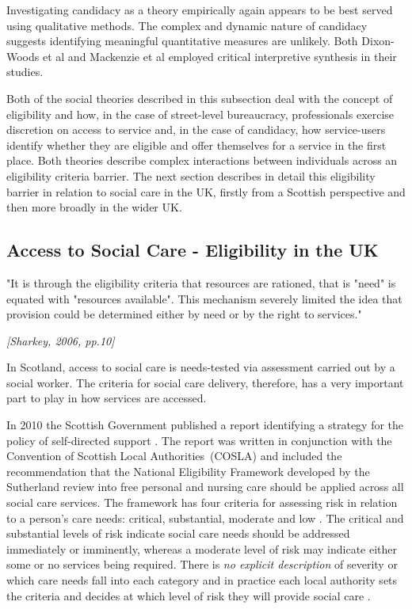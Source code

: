 \documentclass[12pt,]{report}
\begin{document}
Investigating candidacy as a theory empirically again appears to be best
served using qualitative methods. The complex and dynamic nature of
candidacy suggests identifying meaningful quantitative measures are
unlikely. Both Dixon-Woods et al
\citetext{\citeyear{RN438}; \citeyear{RN437}} and Mackenzie et al
\citetext{\citeyear{RN84}; \citeyear{RN434}} employed critical
interpretive synthesis in their studies.

Both of the social theories described in this subsection deal with the
concept of eligibility and how, in the case of street-level bureaucracy,
professionals exercise discretion on access to service and, in the case
of candidacy, how service-users identify whether they are eligible and
offer themselves for a service in the first place. Both theories
describe complex interactions between individuals across an eligibility
criteria barrier. The next section describes in detail this eligibility
barrier in relation to social care in the UK, firstly from a Scottish
perspective and then more broadly in the wider UK.

\subsection{Access to Social Care - Eligibility in the UK}\label{subsubsec:eligibility-uk}

\epigraph{"It is through the eligibility criteria that resources are rationed, that is "need" is equated with "resources available". This mechanism severely limited the idea that provision could be determined either by need or by the right to services."}{\textit{[Sharkey, 2006, pp.10]}}

In Scotland, access to social care is needs-tested via assessment
carried out by a social worker. The criteria for social care delivery,
therefore, has a very important part to play in how services are
accessed.

In 2010 the Scottish Government published a report identifying a
strategy for the policy of self-directed support \citep{RN171}. The
report was written in conjunction with the Convention of Scottish Local
Authorities~(COSLA) and included the recommendation that the National
Eligibility Framework developed by the Sutherland review into free
personal and nursing care \citeyearpar{RN172} should be applied across
all social care services. The framework has four criteria for assessing
risk in relation to a person's care needs: critical, substantial,
moderate and low \citep{RN184}. The critical and substantial levels of
risk indicate social care needs should be addressed immediately or
imminently, whereas a moderate level of risk may indicate either some or
no services being required. There is \textit{no explicit description} of
severity or which care needs fall into each category and in practice
each local authority sets the criteria and decides at which level of
risk they will provide social care \citep{RN170}.
\end{document}
